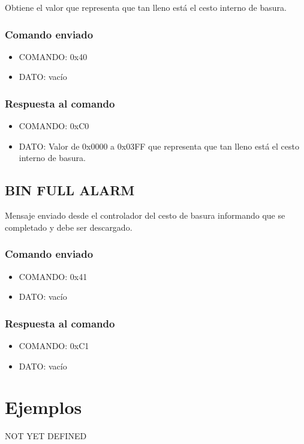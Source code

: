 \documentclass[a4paper,10pt]{article}
\begin{document}
Obtiene el valor que representa que tan lleno est\'a el cesto interno de basura.

\subsubsection*{Comando enviado}

\begin{itemize}
	\item{COMANDO:} 0x40
	\item{DATO:} vac\'io
\end{itemize}

\subsubsection*{Respuesta al comando}

\begin{itemize}
	\item{COMANDO:} 0xC0
	\item{DATO:} Valor de 0x0000 a 0x03FF que representa que tan lleno est\'a el cesto interno de basura.
\end{itemize}

\subsection{BIN FULL ALARM}
\label{bin_full_alarm}

Mensaje enviado desde el controlador del cesto de basura informando que se completado y debe ser descargado.

\subsubsection*{Comando enviado}

\begin{itemize}
	\item{COMANDO:} 0x41
	\item{DATO:} vac\'io
\end{itemize}

\subsubsection*{Respuesta al comando}

\begin{itemize}
	\item{COMANDO:} 0xC1
	\item{DATO:} vac\'io
\end{itemize}


\section{Ejemplos}
\label{ejemplos}

NOT YET DEFINED
\end{document}
